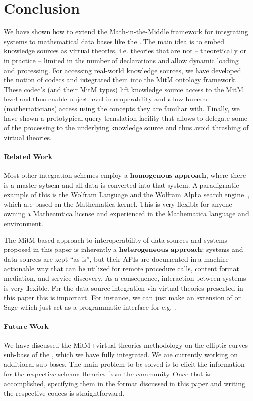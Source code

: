 \section{Conclusion}\label{sec:concl}

We have shown how to extend the Math-in-the-Middle framework for integrating systems to mathematical data bases like the \lmfdb. 
The main idea is to embed knowledge sources as virtual theories, i.e. theories that are not -- theoretically or in practice -- limited in the number of declarations and allow dynamic loading and processing. 
For accessing real-world knowledge sources, we have developed the notion of codecs and integrated them into the MitM ontology framework. 
These codec's (and their MitM types) lift knowledge source access to the MitM level and thus enable object-level interoperability and allow humans (mathematicians) access using the concepts they are familiar with. 
Finally, we have shown a prototypical query translation facility that allows to delegate some of the processing to the underlying knowledge source and thus avoid thrashing of virtual theories. 

\paragraph{Related Work} Most other integration schemes employ a \textbf{homogenous approach}, where there is a master sytsem and all data is converted into that system. 
A paradigmatic example of this is the Wolfram Language and the Wolfram Alpha search engine~\cite{WolframAlpha:on}, which are based on the Mathematica kernel. 
This is very flexible for anyone owning a Matheamtica license and experienced in the Mathematica language and environment.

The MitM-based approach to interoperability of data sources and systems proposed in this paper is inherently a \textbf{heterogeneous approach}: systems and data sources are kept ``as is'', but their APIs are documented in a machine-actionable way that can be utilized for remote procedure calls, content format mediation, and service discovery. 
As a consequence, interaction between systems is very flexible.
For the data source integration via virtual theories presented in this paper this is important. 
For instance, we can just make an extension of \mmt or Sage which just act as a programmatic interface for e.g. \lmfdb. 

\paragraph{Future Work}
We have discussed the MitM+virtual theories methodology on the elliptic curves sub-base of the \lmfdb, which we have fully integrated. 
We are currently working on additional \lmfdb sub-bases. 
The main problem to be solved is to elicit the information for the respective schema theories from the \lmfdb community. 
Once that is accomplished, specifying them in the format discussed in this paper and writing the respective codecs is straightforward. 

